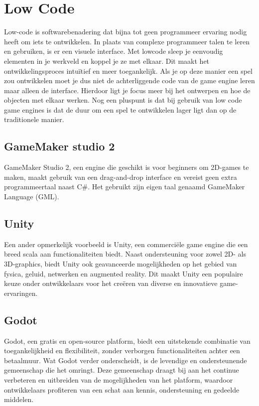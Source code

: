 \section{Low Code}
Low-code is softwarebenadering dat bijna tot geen programmeer ervaring nodig heeft om iets te ontwikkelen. In plaats van complexe programmeer talen te leren en gebruiken, is er een visuele interface.\autocite{Kissflow2024} Met lowcode sleep je eenvoudig elementen in je werkveld en koppel je ze met elkaar. Dit maakt het ontwikkelingsproces intuïtief en meer toegankelijk. Als je op deze manier een spel zou ontwikkelen moet je dus niet de achterliggende code van de game engine leren maar alleen de interface. Hierdoor ligt je focus meer bij het ontwerpen en hoe de objecten met elkaar werken. Nog een pluspunt is dat bij gebruik van low code game engines is dat de duur om een spel te ontwikkelen lager ligt dan op de traditionele manier.



\subsection{GameMaker studio 2}
GameMaker Studio 2, een engine die geschikt is voor beginners om 2D-games te maken, maakt gebruik van een drag-and-drop interface en vereist geen extra programmeertaal naast C\#. Het gebruikt zijn eigen taal genaamd GameMaker Language (GML). \autocite{cossu2019game}

\subsection{Unity}
Een ander opmerkelijk voorbeeld is Unity, een commerciële game engine die een breed scala aan functionaliteiten biedt. Naast ondersteuning voor zowel 2D- als 3D-graphics, biedt Unity ook geavanceerde mogelijkheden op het gebied van fysica, geluid, netwerken en augmented reality. Dit maakt Unity een populaire keuze onder ontwikkelaars voor het creëren van diverse en innovatieve game-ervaringen. \autocite{Haas2014}

\subsection{Godot}
Godot, een gratis en open-source platform, biedt een uitstekende combinatie van toegankelijkheid en flexibiliteit, zonder verborgen functionaliteiten achter een betaalmuur. Wat Godot verder onderscheidt, is de levendige en ondersteunende gemeenschap die het omringt. Deze gemeenschap draagt bij aan het continue verbeteren en uitbreiden van de mogelijkheden van het platform, waardoor ontwikkelaars profiteren van een schat aan kennis, ondersteuning en gedeelde middelen. \autocite{Bradfield2018}

